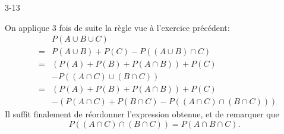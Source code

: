\begin{corrige}{3-13}

On applique 3 fois de suite la règle vue à l'exercice précédent:
\begin{eqnarray*}
 & & P ( A \cup B \cup C)\\
 & = & P ( A \cup B ) + P(C) - P ( (A\cup B) \cap C )\\
 & = & ( P(A) + P(B) + P ( A \cap B ) ) + P(C)\\
 & & - P ( (A\cap C) \cup (B \cap C ) )\\
 & = & ( P(A) + P(B) + P ( A \cap B ) ) + P(C)\\
 & & - ( P (A\cap C) + P(B \cap C) -  P ( (A\cap C) \cap (B \cap C ) ) )
\end{eqnarray*}
Il suffit finalement de réordonner l'expression obtenue, et de remarquer que $$P ( (A\cap C) \cap (B \cap C ) ) = P ( A \cap B \cap C ).$$

\end{corrige}
